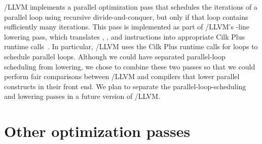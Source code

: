 \tapir/LLVM implements a parallel optimization pass that schedules the
iterations of a parallel loop using recursive divide-and-conquer, but
only if that loop contains sufficiently many iterations.  This pass is
implemented as part of \tapir/LLVM's -line
lowering pass, which translates \detach, \reattach, and \sync
instructions into appropriate Cilk Plus runtime
calls~\cite{IntelCilkPlusABI10}.  In particular, \tapir/LLVM uses the
Cilk Plus runtime calls for \CilkFor loops
\cite[Sec~10.7]{IntelCilkPlusABI10} to schedule parallel
loops.  %
Although we could have separated parallel-loop scheduling from
lowering, we chose to combine these two passes so that we could
perform fair comparisons between \tapir/LLVM and compilers that lower
parallel constructs in their front end.  We plan to separate the
parallel-loop-scheduling and lowering passes in a future version of
\tapir/LLVM\@.




\section{Other optimization passes}

